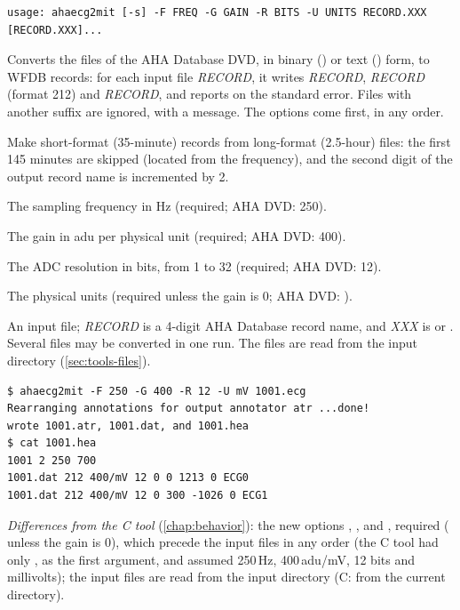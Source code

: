 \begin{lstlisting}[style=signature,language={}]
usage: ahaecg2mit [-s] -F FREQ -G GAIN -R BITS -U UNITS RECORD.XXX [RECORD.XXX]...
\end{lstlisting}
Converts the files of the AHA Database DVD, in binary () or text ()
form, to WFDB records: for each input file \textit{RECORD}, it writes
\textit{RECORD}, \textit{RECORD} (format 212) and
\textit{RECORD}, and reports  on the standard error. Files with
another suffix are ignored, with a message. The options come first, in any order.
\begin{params}
\item[-s] Make short-format (35-minute) records from long-format (2.5-hour) files: the
  first 145 minutes are skipped (located from the  frequency), and the second digit
  of the output record name is incremented by 2.
\item[-F] The sampling frequency in Hz (required; AHA DVD: 250).
\item[-G] The gain in adu per physical unit (required; AHA DVD: 400).
\item[-R] The ADC resolution in bits, from 1 to 32 (required; AHA DVD: 12).
\item[-U] The physical units (required unless the gain is 0; AHA DVD: ).
\item[RECORD.XXX] An input file; \textit{RECORD} is a 4-digit AHA Database record name, and
  \textit{XXX} is  or . Several files may be converted in one run. The
  files are read from the input directory (\cref{sec:tools-files}).
\end{params}
\begin{lstlisting}[style=text]
$ ahaecg2mit -F 250 -G 400 -R 12 -U mV 1001.ecg
Rearranging annotations for output annotator atr ...done!
wrote 1001.atr, 1001.dat, and 1001.hea
$ cat 1001.hea
1001 2 250 700
1001.dat 212 400/mV 12 0 0 1213 0 ECG0
1001.dat 212 400/mV 12 0 300 -1026 0 ECG1
\end{lstlisting}
\textit{Differences from the C tool} (\cref{chap:behavior}): the new options ,
,  and , required ( unless the gain is 0), which precede the
input files in any order (the C tool had only , as the first argument, and assumed
250\,Hz, 400\,adu/mV, 12 bits and millivolts); the input files are read from the input
directory (C: from the current directory).

